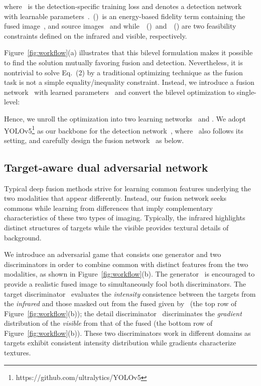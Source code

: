 \documentclass[10pt,twocolumn,letterpaper]{article}
\begin{document}
where~ is the detection-specific training loss and  denotes a detection network with learnable parameters~.~()~is an energy-based fidelity term containing the fused image~, and source images~ and  while~~()~and~~() are two feasibility constraints defined on the infrared and visible, respectively.


Figure~\ref{fig:workflow}(a) illustrates that this bilevel formulation makes it possible to find the solution mutually favoring fusion and detection. Nevertheless, it is nontrivial to solve Eq.~(2) by a traditional optimizing technique as the fusion task is not a simple equality/inequality constraint. Instead, we introduce a fusion network~ with learned parameters~ and convert the bilevel optimization to single-level:         

Hence, we unroll the optimization into two learning networks~ and . We adopt YOLOv5\footnote{https://github.com/ultralytics/YOLOv5} as our backbone for the detection network~, where~ also follows its setting, and carefully design the fusion network~ as below.
\vspace{-0.2cm} 
\subsection{Target-aware dual adversarial network}
Typical deep fusion methods strive for learning common features underlying the two modalities that appear differently. Instead, our fusion network seeks commons while learning from differences that imply complementary characteristics of these two types of imaging. Typically, the infrared highlights distinct structures of targets while the visible provides textural details of background.

We introduce an adversarial game that consists one generator and two discriminators in order to combine common with distinct features from the two modalities, as shown in Figure~\ref{fig:workflow}(b). The generator~ is encouraged to provide a realistic fused image to simultaneously fool both discriminators. The target discriminator~ evaluates the \emph{intensity} consistence between the targets from the \emph{infrared} and those masked out from the fused given by~ (the top row of Figure~\ref{fig:workflow}(b)); the detail discriminator~ discriminates the \emph{gradient} distribution of the \emph{visible} from that of the fused (the bottom row of Figure~\ref{fig:workflow}(b)). These two discriminators work in different domains as targets exhibit consistent intensity distribution while gradients characterize textures.
\end{document}
